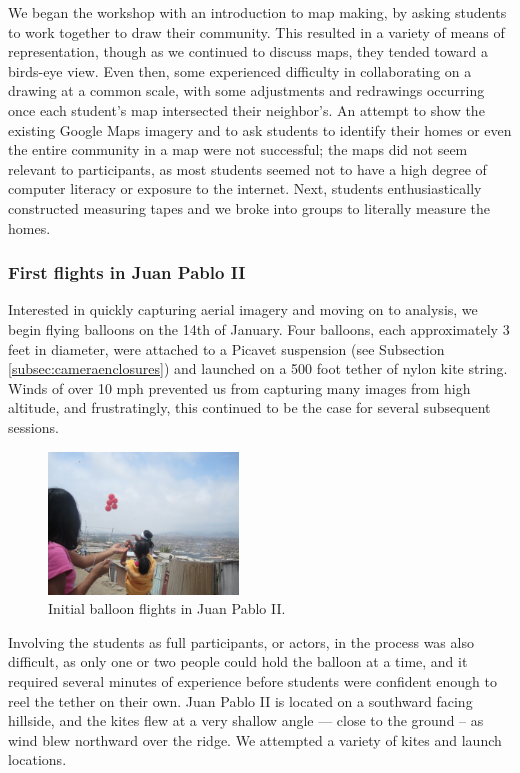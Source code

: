 \documentclass[11pt,oneside,notitlepage]{report}
\begin{document}
{{We began the workshop with an introduction to map making, by asking students to work together to draw their community. This resulted in a variety of means of representation, though as we continued to discuss maps, they tended toward a birds-eye view. Even then, some experienced difficulty in collaborating on a drawing at a common scale, with some adjustments and redrawings occurring once each student's map intersected their neighbor's. An attempt to show the existing Google Maps imagery and to ask students to identify their homes or even the entire community in a map were not successful; the maps did not seem relevant to participants, as most students seemed not to have a high degree of computer literacy or exposure to the internet. Next, students enthusiastically constructed measuring tapes and we broke into groups to literally measure the homes. 

\subsubsection{First flights in Juan Pablo II}

Interested in quickly capturing aerial imagery and moving on to analysis, we begin flying balloons on the 14th of January. Four balloons, each approximately 3 feet in diameter, were attached to a Picavet suspension (see Subsection \ref{subsec:cameraenclosures}) and launched on a 500 foot tether of nylon kite string. Winds of over 10 mph prevented us from capturing many images from high altitude, and frustratingly, this continued to be the case for several subsequent sessions. 

\begin{figure}
	\begin{flushright}
		\includegraphics[width=0.45\textwidth]{images/juan-pablo-first-flight.jpg}
		\caption{Initial balloon flights in Juan Pablo II.}
	\end{flushright}
\end{figure}

Involving the students as full participants, or actors, in the process was also difficult, as only one or two people could hold the balloon at a time, and it required several minutes of experience before students were confident enough to reel the tether on their own. Juan Pablo II is located on a southward facing hillside, and the kites flew at a very shallow angle --- close to the ground -- as wind blew northward over the ridge. We attempted a variety of kites and launch locations. 

}}
\end{document}
